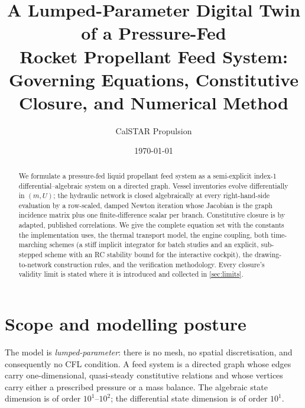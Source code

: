 \documentclass[11pt,a4paper]{article}
\title{A Lumped-Parameter Digital Twin of a Pressure-Fed\\
       Rocket Propellant Feed System:\\
       Governing Equations, Constitutive Closure, and Numerical Method}
\author{CalSTAR Propulsion}
\date{\today}
\begin{document}
\maketitle

\begin{abstract}
We formulate a pressure-fed liquid propellant feed system as a semi-explicit
index-1 differential--algebraic system on a directed graph. Vessel inventories
evolve differentially in $(m, U)$; the hydraulic network is closed algebraically
at every right-hand-side evaluation by a row-scaled, damped Newton iteration
whose Jacobian is the graph incidence matrix plus one finite-difference scalar
per branch. Constitutive closure is by adapted, published correlations. We give
the complete equation set with the constants the implementation uses, the
thermal transport model, the engine coupling, both time-marching schemes (a
stiff implicit integrator for batch studies and an explicit, sub-stepped
scheme with an RC stability bound for the interactive cockpit), the
drawing-to-network construction rules, and the verification methodology.
Every closure's validity limit is stated where it is introduced and collected
in \cref{sec:limits}.
\end{abstract}

\tableofcontents

\section{Scope and modelling posture}

The model is \emph{lumped-parameter}: there is no mesh, no spatial
discretisation, and consequently no CFL condition. A feed system is a directed
graph whose edges carry one-dimensional, quasi-steady constitutive relations and
whose vertices carry either a prescribed pressure or a mass balance. The
algebraic state dimension is of order $10^1$--$10^2$; the differential state
dimension is of order $10^1$.
\end{document}
